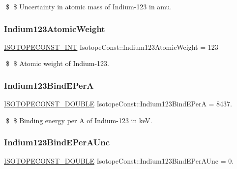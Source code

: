 \$ \$ Uncertainty in atomic mass of Indium-\/123 in amu. \mbox{\label{group___isotope_const-_indium-_in123_gad3ab9532308748bd8fb5c6bc480bf04c}} 
\subsubsection{\texorpdfstring{Indium123\+Atomic\+Weight}{Indium123AtomicWeight}}
{\footnotesize\ttfamily \mbox{\hyperlink{group___isotope_const-_macros_ga5f18360b3e99483a35c32d789e62621c}{I\+S\+O\+T\+O\+P\+E\+C\+O\+N\+S\+T\+\_\+\+I\+NT}} Isotope\+Const\+::\+Indium123\+Atomic\+Weight = 123}

\$ \$ Atomic weight of Indium-\/123. \mbox{\label{group___isotope_const-_indium-_in123_gaf51203396f65f2bddaee01022e990be2}} 
\subsubsection{\texorpdfstring{Indium123\+Bind\+E\+PerA}{Indium123BindEPerA}}
{\footnotesize\ttfamily \mbox{\hyperlink{group___isotope_const-_macros_ga8f45a7272ce02c0b4c65c44636ed719a}{I\+S\+O\+T\+O\+P\+E\+C\+O\+N\+S\+T\+\_\+\+D\+O\+U\+B\+LE}} Isotope\+Const\+::\+Indium123\+Bind\+E\+PerA = 8437.}

\$ \$ Binding energy per A of Indium-\/123 in keV. \mbox{\label{group___isotope_const-_indium-_in123_gac6acd47e3f635759106f5edabd24c27c}} 
\subsubsection{\texorpdfstring{Indium123\+Bind\+E\+Per\+A\+Unc}{Indium123BindEPerAUnc}}
{\footnotesize\ttfamily \mbox{\hyperlink{group___isotope_const-_macros_ga8f45a7272ce02c0b4c65c44636ed719a}{I\+S\+O\+T\+O\+P\+E\+C\+O\+N\+S\+T\+\_\+\+D\+O\+U\+B\+LE}} Isotope\+Const\+::\+Indium123\+Bind\+E\+Per\+A\+Unc = 0.}


